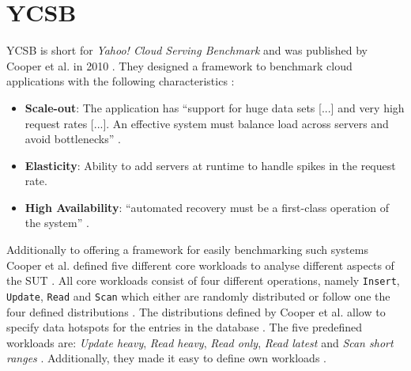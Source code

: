 \section{YCSB}
\label{sec:ycsb}
YCSB is short for \emph{Yahoo! Cloud Serving Benchmark} and was published by Cooper et al. in 2010 \cite{ycsb.2010}. They designed a framework to benchmark cloud applications with the following characteristics \cite[2]{ycsb.2010}:

\begin{itemize}
  \item \textbf{Scale-out}: The application has \enquote{support for huge data sets [...] and very high request rates [...]. An effective system must balance load across servers and avoid bottlenecks} \cite[2]{ycsb.2010}.
  \item \textbf{Elasticity}: Ability to add servers at runtime to handle spikes in the request rate.
  \item \textbf{High Availability}: \enquote{automated recovery must be a first-class operation of the system} \cite[2]{ycsb.2010}.
\end{itemize}

Additionally to offering a framework for easily benchmarking such systems Cooper et al. defined five different core workloads to analyse different aspects of the \ac{SUT} \cite[4]{ycsb.2010}. All core workloads consist of four different operations, namely \texttt{Insert}, \texttt{Update}, \texttt{Read} and \texttt{Scan} which either are randomly distributed or follow one the four defined distributions \cite[4 - 5]{ycsb.2010}. The distributions defined by Cooper et al. allow to specify data hotspots for the entries in the database \cite[5]{ycsb.2010}. The five predefined workloads are: \emph{Update heavy}, \emph{Read heavy}, \emph{Read only}, \emph{Read latest} and \emph{Scan short ranges} \cite[6]{ycsb.2010}. Additionally, they made it easy to define own workloads \cite[5]{ycsb.2010}.